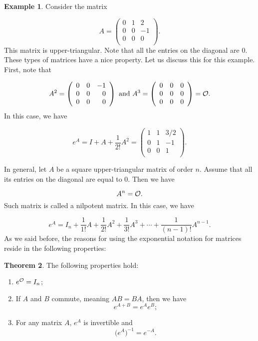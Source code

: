 \documentclass[11pt]{article}
\theoremstyle{definition}
\newtheorem{thm}{Theorem}[section]
\newtheorem{exmp}[thm]{Example}
\theoremstyle{plain}
\begin{document}
\begin{exmp}
Consider the matrix

\[
A= \left(\begin{array}{rrr} 0&1&2\\ 0&0&-1\\ 0&0&0\\ \end{array}\right).
\]
This matrix is upper-triangular. Note that all the entries on the diagonal are $0$. These types of matrices have a nice property. Let us discuss this for this example. First, note that

\[
A^2 =
\left(
\begin{array}{rrr}
0&0&-1\\ 0&0&0\\ 0&0&0\\
\end{array}
\right)
\mbox{ and }
A^3=
\left(
\begin{array}{rrr}
0&0&0\\ 0&0&0\\ 0&0&0\\
\end{array}\right) = {\cal O}.
\]
In this case, we have

\[
e^A = I + A + \frac{1}{2!} A^2 = \left(\begin{array}{rrr} 1&1&3/2\\ 0&1&-1\\ 0&0&1\\ \end{array}\right).
\]

\end{exmp}

In general, let $A$ be a square upper-triangular matrix of order $n$. Assume that all its entries on the diagonal are equal to $0$. Then we have

\[
A^n = {\cal O}.
\]
Such matrix is called a nilpotent matrix. In this case, we have

\[
e^A = I_n + \frac{1}{1!}A+ \frac{1}{2!}A^2+ \frac{1}{3!}A^3+\cdots+ \frac{1}{(n-1)!}A^{n-1}.
\]
As we said before, the reasons for using the exponential notation for matrices reside in the following properties:

\begin{thm}
The following properties hold:
\begin{enumerate}
  \item $e^{\cal O} = I_n$;
  \item If $A$ and $B$ commute, meaning $AB = BA$, then we have
\[e^{A+B} = e^Ae^B;\]

  \item For any matrix $A$, $e^A$ is invertible and
\[\Big(e^A \Big)^{-1} = e^{-A}.\]
\end{enumerate}

\end{thm}
\end{document}
